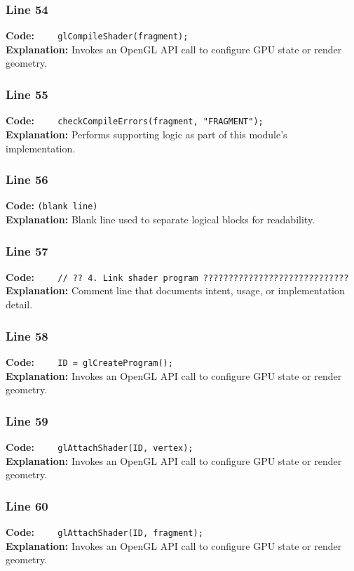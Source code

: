 \documentclass[11pt,a4paper]{article}
\begin{document}
\subsubsection*{Line 54}
\textbf{Code:} \verb|    glCompileShader(fragment);|\\
\textbf{Explanation:} Invokes an OpenGL API call to configure GPU state or render geometry.

\subsubsection*{Line 55}
\textbf{Code:} \verb|    checkCompileErrors(fragment, "FRAGMENT");|\\
\textbf{Explanation:} Performs supporting logic as part of this module's implementation.

\subsubsection*{Line 56}
\textbf{Code:} \texttt{(blank line)}\\
\textbf{Explanation:} Blank line used to separate logical blocks for readability.

\subsubsection*{Line 57}
\textbf{Code:} \verb|    // ?? 4. Link shader program ?????????????????????????????|\\
\textbf{Explanation:} Comment line that documents intent, usage, or implementation detail.

\subsubsection*{Line 58}
\textbf{Code:} \verb|    ID = glCreateProgram();|\\
\textbf{Explanation:} Invokes an OpenGL API call to configure GPU state or render geometry.

\subsubsection*{Line 59}
\textbf{Code:} \verb|    glAttachShader(ID, vertex);|\\
\textbf{Explanation:} Invokes an OpenGL API call to configure GPU state or render geometry.

\subsubsection*{Line 60}
\textbf{Code:} \verb|    glAttachShader(ID, fragment);|\\
\textbf{Explanation:} Invokes an OpenGL API call to configure GPU state or render geometry.
\end{document}
